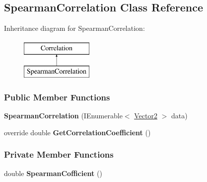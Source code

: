 \hypertarget{classDataTools_1_1correlation_1_1SpearmanCorrelation}{}\subsection{Spearman\+Correlation Class Reference}
\label{classDataTools_1_1correlation_1_1SpearmanCorrelation}
Inheritance diagram for Spearman\+Correlation\+:\begin{figure}[H]
\begin{center}
\leavevmode
\includegraphics[height=2.000000cm]{classDataTools_1_1correlation_1_1SpearmanCorrelation}
\end{center}
\end{figure}
\subsubsection*{Public Member Functions}
\begin{DoxyCompactItemize}
\item 
\mbox{\label{classDataTools_1_1correlation_1_1SpearmanCorrelation_a57c5b09341d60a6a06276a9a913474ba}} 
{\bfseries Spearman\+Correlation} (I\+Enumerable$<$ \hyperlink{classDataTools_1_1Vector2}{Vector2} $>$ data)
\item 
\mbox{\label{classDataTools_1_1correlation_1_1SpearmanCorrelation_afff258bf05afa59c8fd4118e650e1682}} 
override double {\bfseries Get\+Correlation\+Coefficient} ()
\end{DoxyCompactItemize}
\subsubsection*{Private Member Functions}
\begin{DoxyCompactItemize}
\item 
\mbox{\label{classDataTools_1_1correlation_1_1SpearmanCorrelation_af82705b8d60fdd28e5c1a6121769db4b}} 
double {\bfseries Spearman\+Cofficient} ()
\end{DoxyCompactItemize}
